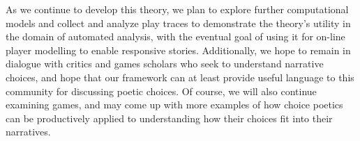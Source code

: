 \documentclass[arts,article,submit,moreauthors,pdftex,10pt,a4paper]{Definitions/mdpi}
\begin{document}
As we continue to develop this theory, we plan to explore further computational models and collect and analyze play traces to demonstrate the theory's utility in the domain of automated analysis, with the eventual goal of using it for on-line player modelling to enable responsive stories.
%
Additionally, we hope to remain in dialogue with critics and games scholars who seek to understand narrative choices, and hope that our framework can at least provide useful language to this community for discussing poetic choices.
%
Of course, we will also continue examining games, and may come up with more examples of how choice poetics can be productively applied to understanding how their choices fit into their narratives.

\vspace{6pt} 

\supplementary{}





\end{document}
